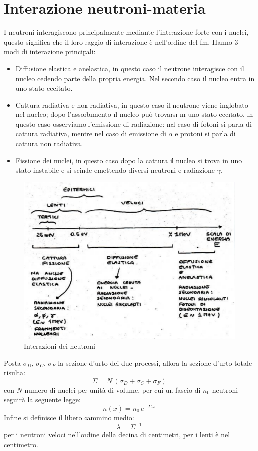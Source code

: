 \section{Interazione neutroni-materia}
I neutroni interagiscono principalmente mediante l'interazione forte con i nuclei, questo significa che il loro raggio di interazione \`e nell'ordine del fm.
Hanno 3 modi di interazione principali:
\begin{itemize}
\item Diffusione elastica e anelastica, in questo caso il neutrone interagisce con il nucleo cedendo parte della propria energia.
Nel secondo caso il nucleo entra in uno stato eccitato.
\item Cattura radiativa e non radiativa, in questo caso il neutrone viene inglobato nel nucleo;
dopo l'assorbimento il nucleo pu\`o trovarsi in uno stato eccitato, in questo caso osserviamo l'emissione di radiazione: nel caso di fotoni si parla di cattura radiativa, 
mentre nel caso di emissione di $\alpha$ e protoni si parla di cattura non radiativa.
\item Fissione dei nuclei, in questo caso dopo la cattura il nucleo si trova in uno stato instabile e si scinde emettendo diversi neutroni e radiazione $\gamma$.
\end{itemize}
\begin{figure}[htbp]
\begin{center}
\includegraphics[scale=0.8]{./Immagini/InterazioneNeutroni.png}
\caption{Interazioni dei neutroni}
\end{center}
\end{figure}
Posta $\sigma_D$, $\sigma_C$, $\sigma_F$ la sezione d'urto dei due processi, allora la sezione d'urto totale risulta:
\begin{equation*}
\Sigma = N \, (\sigma_D + \sigma_C + \sigma_F)
\end{equation*}
con $N$ numero di nuclei per unit\`a di volume, per cui un fascio di $n_0$ neutroni seguir\`a la seguente legge:
\begin{equation*}
n(x) = n_0 \, e^{-\Sigma \, x}
\end{equation*}
Infine si definisce il libero cammino medio:
\begin{equation*}
\lambda = \Sigma^{-1}
\end{equation*}
per i neutroni veloci nell'ordine della decina di centimetri, per i lenti \`e nel centimetro.